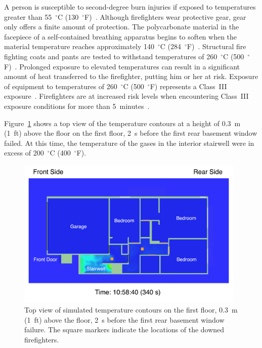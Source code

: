 \documentclass[12pt,oneside]{book}
\begin{document}
A person is susceptible to second-degree burn injuries if exposed to temperatures greater than 55~$^{\circ}$C (130~$^{\circ}$F)~\cite{contactburn}. Although firefighters wear protective gear, gear only offers a finite amount of protection. The polycarbonate material in the facepiece of a self-contained breathing apparatus begins to soften when the material temperature reaches approximately 140~$^{\circ}$C (284~$^{\circ}$F)~\cite{mensch2011emergency}. Structural fire fighting coats and pants are tested to withstand temperatures of 260~$^{\circ}$C (500~$^{\circ}$F)~\cite{nfpa2013standard}. Prolonged exposure to elevated temperatures can result in a significant amount of heat transferred to the firefighter, putting him or her at risk. Exposure of equipment to temperatures of 260~$^{\circ}$C (500~$^{\circ}$F) represents a Class~III exposure~\cite{Donnelly2006}. Firefighters are at increased risk levels when encountering Class~III exposure conditions for more than 5~minutes~\cite{Donnelly2006}.

Figure~\ref{fig:smv_flow_path_top_1} shows a top view of the temperature contours at a height of 0.3~m (1~ft) above the floor on the first floor, 2~s before the first rear basement window failed. At this time, the temperature of the gases in the interior stairwell were in excess of 200~$^{\circ}$C (400~$^{\circ}$F).

\begin{figure}[!ht]
\includegraphics[width=4.3in]{../Figures/SMV_Top_Temp_340_s}


\caption[Simulated temperature contours on the first floor before basement window failure.]
{Top view of simulated temperature contours on the first floor, 0.3~m (1~ft) above the floor, 2~s before the first rear basement window failure. The square markers indicate the locations of the downed firefighters.}
\label{fig:smv_flow_path_top_1}
\end{figure}
\end{document}
